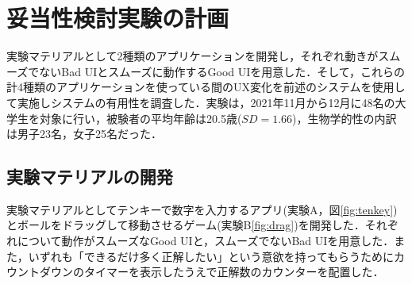 \section{妥当性検討実験の計画}


実験マテリアルとして2種類のアプリケーションを開発し，それぞれ動きがスムーズでないBad UIとスムーズに動作するGood UIを用意した．そして，これらの計4種類のアプリケーションを使っている間のUX変化を前述のシステムを使用して実施しシステムの有用性を調査した．実験は，2021年11月から12月に48名の大学生を対象に行い，被験者の平均年齢は20.5歳($SD=1.66$)，生物学的性の内訳は男子23名，女子25名だった．

\subsection{実験マテリアルの開発}

実験マテリアルとしてテンキーで数字を入力するアプリ(実験A，図\ref{fig:tenkey})とボールをドラッグして移動させるゲーム(実験B\ref{fig:drag})を開発した．それぞれについて動作がスムーズなGood UIと，スムーズでないBad UIを用意した．また，いずれも「できるだけ多く正解したい」という意欲を持ってもらうためにカウントダウンのタイマーを表示したうえで正解数のカウンターを配置した．

